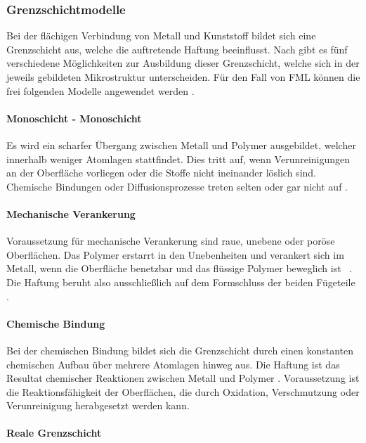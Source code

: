 \subsubsection{Grenzschichtmodelle}\label{sec:modelle}

Bei der flächigen Verbindung von Metall und Kunststoff bildet sich eine Grenzschicht aus, welche die auftretende Haftung beeinflusst.
Nach \cite{Haefer.1987} gibt es fünf verschiedene Möglichkeiten zur Ausbildung dieser Grenzschicht, welche sich in der jeweils gebildeten Mikrostruktur unterscheiden.
Für den Fall von FML können die frei folgenden Modelle angewendet werden \cite{Flock.2012}.

\paragraph{Monoschicht - Monoschicht}

Es wird ein scharfer Übergang zwischen Metall und Polymer ausgebildet, welcher innerhalb weniger Atomlagen stattfindet.
Dies tritt auf, wenn Verunreinigungen an der Oberfläche vorliegen oder die Stoffe nicht ineinander löslich sind.
Chemische Bindungen oder Diffusionsprozesse treten selten oder gar nicht auf \cite{Mann.1993,Haefer.1987}.

\paragraph{Mechanische Verankerung} 

Voraussetzung für mechanische Verankerung sind raue, unebene oder poröse Oberflächen.
Das Polymer erstarrt in den Unebenheiten und verankert sich im Metall, wenn die Oberfläche benetzbar und das flüssige Polymer beweglich ist \cite{Haefer.1987}~.
Die Haftung beruht also ausschließlich auf dem Formschluss der beiden Fügeteile \cite{Flock.2012}.

\paragraph{Chemische Bindung}

Bei der chemischen Bindung bildet sich die Grenzschicht durch einen konstanten chemischen Aufbau über mehrere Atomlagen hinweg aus.
Die Haftung ist das Resultat chemischer Reaktionen zwischen Metall und Polymer \cite{Haefer.1987}.
Voraussetzung ist die Reaktionsfähigkeit der Oberflächen, die durch Oxidation, Verschmutzung oder Verunreinigung herabgesetzt werden kann.

\paragraph{Reale Grenzschicht}

